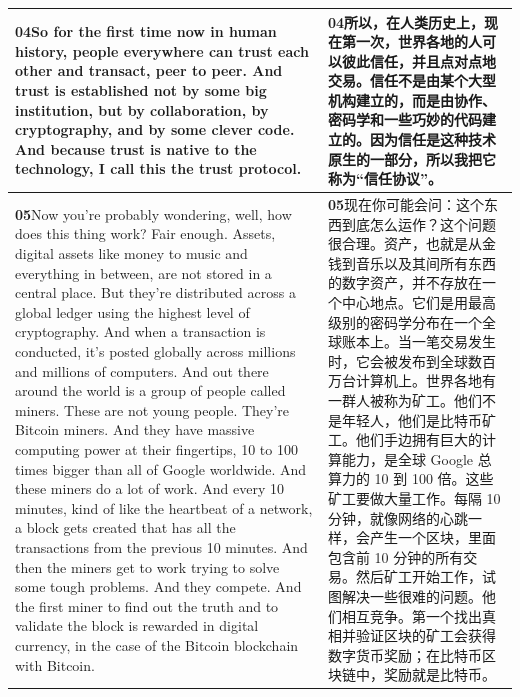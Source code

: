 \documentclass[UTF8,zihao=-4,fontset=fandol]{ctexart}
\newcommand{\TranscriptColumn}{\raggedright\arraybackslash\hyphenpenalty=10000\exhyphenpenalty=10000\sloppy}
\begin{document}
\begin{longtable}{>{\TranscriptColumn}p{} >{\TranscriptColumn}p{}}
\textbf{04}\quad So for the first time now in human history, people everywhere can trust each other and transact, peer to peer. And trust is established not by some big institution, but by collaboration, by cryptography, and by some clever code. And because trust is native to the technology, I call this the trust protocol. & \textbf{04}\quad 所以，在人类历史上，现在第一次，世界各地的人可以彼此信任，并且点对点地交易。信任不是由某个大型机构建立的，而是由协作、密码学和一些巧妙的代码建立的。因为信任是这种技术原生的一部分，所以我把它称为“信任协议”。 \\ \hline
\textbf{05}\quad Now you're probably wondering, well, how does this thing work? Fair enough. Assets, digital assets like money to music and everything in between, are not stored in a central place. But they're distributed across a global ledger using the highest level of cryptography. And when a transaction is conducted, it's posted globally across millions and millions of computers. And out there around the world is a group of people called miners. These are not young people. They're Bitcoin miners. And they have massive computing power at their fingertips, 10 to 100 times bigger than all of Google worldwide. And these miners do a lot of work. And every 10 minutes, kind of like the heartbeat of a network, a block gets created that has all the transactions from the previous 10 minutes. And then the miners get to work trying to solve some tough problems. And they compete. And the first miner to find out the truth and to validate the block is rewarded in digital currency, in the case of the Bitcoin blockchain with Bitcoin. & \textbf{05}\quad 现在你可能会问：这个东西到底怎么运作？这个问题很合理。资产，也就是从金钱到音乐以及其间所有东西的数字资产，并不存放在一个中心地点。它们是用最高级别的密码学分布在一个全球账本上。当一笔交易发生时，它会被发布到全球数百万台计算机上。世界各地有一群人被称为矿工。他们不是年轻人，他们是比特币矿工。他们手边拥有巨大的计算能力，是全球 Google 总算力的 10 到 100 倍。这些矿工要做大量工作。每隔 10 分钟，就像网络的心跳一样，会产生一个区块，里面包含前 10 分钟的所有交易。然后矿工开始工作，试图解决一些很难的问题。他们相互竞争。第一个找出真相并验证区块的矿工会获得数字货币奖励；在比特币区块链中，奖励就是比特币。 \\ \hline

\end{longtable}
\end{document}
